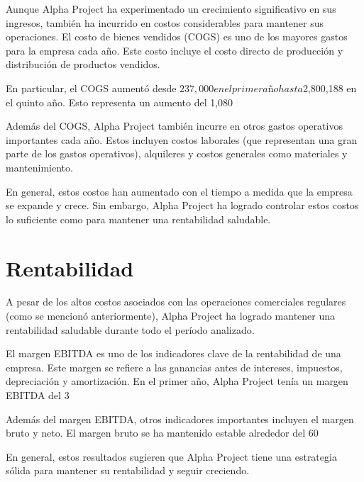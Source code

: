 Aunque Alpha Project ha experimentado un crecimiento significativo en sus ingresos, también ha incurrido en costos considerables para mantener sus operaciones. El costo de bienes vendidos (COGS) es uno de los mayores gastos para la empresa cada año. Este costo incluye el costo directo de producción y distribución de productos vendidos.

En particular, el COGS aumentó desde $237,000 en el primer año hasta $2,800,188 en el quinto año. Esto representa un aumento del 1,080%

Además del COGS, Alpha Project también incurre en otros gastos operativos importantes cada año. Estos incluyen costos laborales (que representan una gran parte de los gastos operativos), alquileres y costos generales como materiales y mantenimiento.

En general, estos costos han aumentado con el tiempo a medida que la empresa se expande y crece. Sin embargo, Alpha Project ha logrado controlar estos costos lo suficiente como para mantener una rentabilidad saludable.

\section{Rentabilidad}

A pesar de los altos costos asociados con las operaciones comerciales regulares (como se mencionó anteriormente), Alpha Project ha logrado mantener una rentabilidad saludable durante todo el período analizado.

El margen EBITDA es uno de los indicadores clave de la rentabilidad de una empresa. Este margen se refiere a las ganancias antes de intereses, impuestos, depreciación y amortización. En el primer año, Alpha Project tenía un margen EBITDA del 3%

Además del margen EBITDA, otros indicadores importantes incluyen el margen bruto y neto. El margen bruto se ha mantenido estable alrededor del 60%

En general, estos resultados sugieren que Alpha Project tiene una estrategia sólida para mantener su rentabilidad y seguir creciendo.

